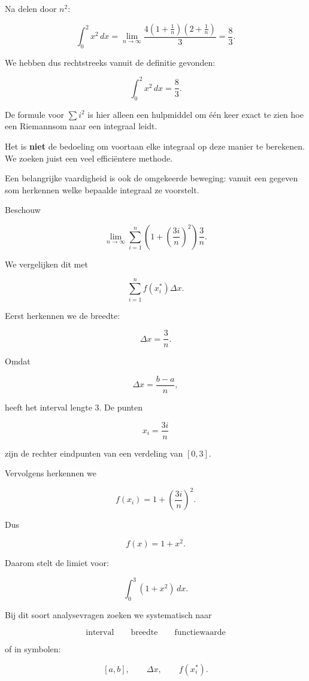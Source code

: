 \documentclass{ximera}
\begin{document}
Na delen door \(n^2\):

\[
\int_0^2x^2\,dx
=
\lim_{n\to\infty}
\frac{4\left(1+\frac1n\right)
\left(2+\frac1n\right)}{3}
=
\boxed{\frac83}.
\]

We hebben dus rechtstreeks vanuit de definitie gevonden:

\[
\boxed{
\int_0^2x^2\,dx=\frac83
}.
\]

\begin{opmerking}
De formule voor \(\sum i^2\) is hier alleen een hulpmiddel om één keer
exact te zien hoe een Riemannsom naar een integraal leidt.

Het is \textbf{niet} de bedoeling om voortaan elke integraal op deze
manier te berekenen. We zoeken juist een veel efficiëntere methode.
\end{opmerking}




Een belangrijke vaardigheid is ook de omgekeerde beweging: vanuit een
gegeven som herkennen welke bepaalde integraal ze voorstelt.

Beschouw

\[
\lim_{n\to\infty}
\sum_{i=1}^{n}
\left(
1+\left(\frac{3i}{n}\right)^2
\right)
\frac{3}{n}.
\]

We vergelijken dit met

\[
\sum_{i=1}^{n}f(x_i^\ast)\Delta x.
\]

Eerst herkennen we de breedte:

\[
\Delta x=\frac{3}{n}.
\]

Omdat

\[
\Delta x=\frac{b-a}{n},
\]

heeft het interval lengte \(3\). De punten

\[
x_i=\frac{3i}{n}
\]

zijn de rechter eindpunten van een verdeling van \([0,3]\).

Vervolgens herkennen we

\[
f(x_i)
=
1+\left(\frac{3i}{n}\right)^2.
\]

Dus

\[
f(x)=1+x^2.
\]

Daarom stelt de limiet voor:

\[
\boxed{
\int_0^3(1+x^2)\,dx
}.
\]

\begin{opmerking}
Bij dit soort analysevragen zoeken we systematisch naar

\[
\boxed{
\text{interval}
\qquad
\text{breedte}
\qquad
\text{functiewaarde}
}
\]

of in symbolen:

\[
[a,b],
\qquad
\Delta x,
\qquad
f(x_i^\ast).
\]
\end{opmerking}
\end{document}
